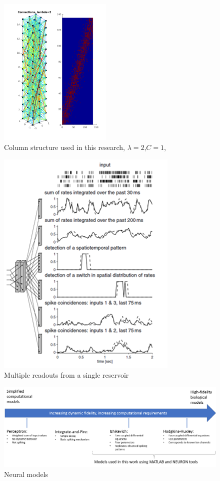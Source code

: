 \documentclass[a4paper,11pt]{article}
\begin{document}
\begin{figure}[p]
 \caption{Column structure used in this research, $\lambda=2$,$C=1$,}
 \label{fig:column_structure}
 \centering
   \includegraphics[width=0.48\textwidth]{fig/lambda2}
\end{figure}

\begin{figure}[p]
	\centering
	\includegraphics{fig/MultipleReadouts}
	\caption{Multiple readouts from a single reservoir \cite{maas2002}}
	\label{fig:lsm_multiple_readouts}
\end{figure}

\begin{figure}[p]
 \caption{Neural models}
 \label{fig:neural_models}
 \centering
   \includegraphics[width=\textwidth]{fig/neural_models}
\end{figure}
\end{document}
